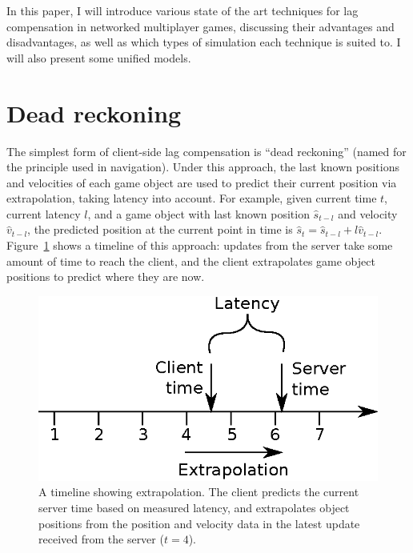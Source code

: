\documentclass[conference]{IEEEtran}
\begin{document}
	In this paper, I will introduce various state of the art techniques for lag compensation in networked multiplayer games, discussing their advantages and disadvantages, as well as which types of simulation each technique is suited to. I will also present some unified models.



	\section{Dead reckoning}

	The simplest form of client-side lag compensation is ``dead reckoning'' (named for the principle used in navigation). Under this approach, the last known positions and velocities of each game object are used to predict their current position via extrapolation, taking latency into account. For example, given current time $t$, current latency $l$, and a game object with last known position $\hat{s}_{t - l}$ and velocity $\hat{v}_{t - l}$, the predicted position at the current point in time is $\hat{s}_{t} = \hat{s}_{t - l} + l\hat{v}_{t - l}$. Figure~\ref{fig:extrapolation_timeline} shows a timeline of this approach: updates from the server take some amount of time to reach the client, and the client extrapolates game object positions to predict where they are now.

	\begin{figure}
		\centering\includegraphics[width=\linewidth]{figures/extrapolation_timeline.eps}
		\caption{A timeline showing extrapolation. The client predicts the current server time based on measured latency, and extrapolates object positions from the position and velocity data in the latest update received from the server ($t = 4$).}
		\label{fig:extrapolation_timeline}
	\end{figure}
\end{document}
